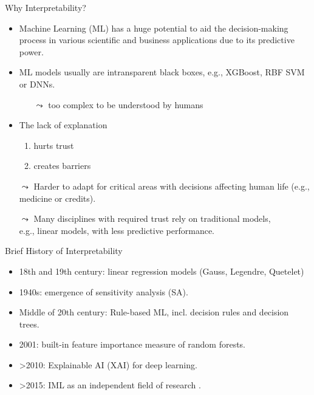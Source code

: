 \documentclass[11pt,compress,t,notes=noshow, aspectratio=169, xcolor=table]{beamer}
\begin{document}
\begin{frame}{Why Interpretability?}
		\begin{itemize}
			\item Machine Learning (ML) has a huge potential to aid the decision-making process in various scientific and business applications due to its predictive power.
			\pause
			\smallskip
			\item ML models usually are intransparent black boxes, e.g., XGBoost, RBF SVM or DNNs.
			\begin{itemize}
				\item[$\leadsto$] too complex to be understood by humans
			\end{itemize}
			\pause
			\smallskip
			\item The lack of explanation
			\begin{enumerate}
				\item hurts trust
				\item creates barriers
			\end{enumerate}
			\pause
			\smallskip
		    \item[$\leadsto$] Harder to adapt for critical areas with decisions affecting human life (e.g., medicine or credits).
			\pause
			\item[$\leadsto$] Many disciplines with required trust rely on traditional models,\\ e.g., linear models, with less predictive performance.
		\end{itemize}
	\end{frame}


	\begin{frame}{Brief History of Interpretability}
		\begin{itemize}
			\item 18th and 19th century: linear regression models (Gauss, Legendre, Quetelet)
			\medskip
			\item 1940s: emergence of sensitivity analysis (SA).
			\medskip
			\item Middle of 20th century: Rule-based ML, incl. decision rules and decision trees.
			\medskip
			\item 2001: built-in feature importance measure of random forests.
			\medskip
			\item >2010: Explainable AI (XAI) for deep learning.
			\medskip
			\item >2015: IML as an independent field of research .
		\end{itemize}
	\end{frame}
\end{document}
